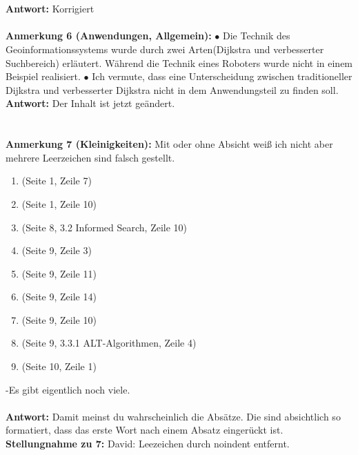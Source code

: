\documentclass[a4paper,12pt]{book}
\begin{document}
\\  \\  
\textbf{Antwort:} Korrigiert
\\
\\
\textbf{Anmerkung 6 (Anwendungen, Allgemein):}
\newline
$\bullet$ Die Technik des Geoinformationssystems wurde durch zwei Arten(Dijkstra und verbesserter Suchbereich) erläutert. Während die Technik eines Roboters wurde nicht in einem Beispiel realisiert.
\newline
$\bullet$ Ich vermute, dass eine Unterscheidung zwischen traditioneller Dijkstra und verbesserter Dijkstra nicht in dem Anwendungsteil zu finden soll. 
\newline 
\\
\textbf{Antwort:} Der Inhalt ist jetzt geändert.
 \\
 \\
\\
\textbf{Anmerkung 7 (Kleinigkeiten):}
Mit oder ohne Absicht weiß ich nicht aber mehrere Leerzeichen sind falsch gestellt.
\begin{enumerate}
	\item  (Seite 1, Zeile 7)
	\item  (Seite 1, Zeile 10)
	\item  (Seite 8, 3.2 Informed Search, Zeile 10)
	\item  (Seite 9, Zeile 3)
	\item  (Seite 9, Zeile 11)
	\item  (Seite 9, Zeile 14)
	\item  (Seite 9, Zeile 10)
	\item  (Seite 9, 3.3.1 ALT-Algorithmen, Zeile 4)
	\item  (Seite 10, Zeile 1)
\end{enumerate}
-Es gibt eigentlich noch viele.
\\ \\
\textbf{Antwort:}
Damit meinst du wahrscheinlich die Absätze. Die sind absichtlich so formatiert, dass das erste Wort nach einem Absatz eingerückt ist.
\\
\textbf{Stellungnahme zu 7:}
David: Leezeichen durch noindent entfernt.
\\
\end{document}
